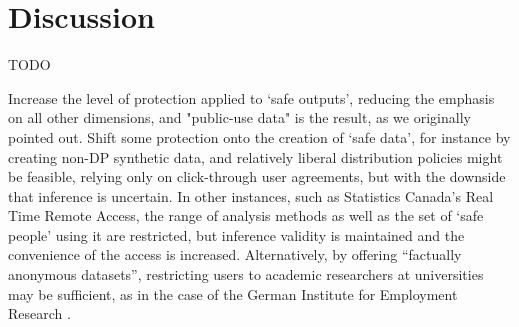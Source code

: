 



\section{Discussion}

TODO

Increase the level of protection applied to `safe outputs', reducing the emphasis on all other dimensions, and "public-use data" is the result, as we originally pointed out. Shift some protection onto the creation of  `safe data', for instance by creating non-DP synthetic data, and relatively liberal distribution policies might be feasible, relying only on click-through user agreements, but with the downside that inference is uncertain. In other instances, such as Statistics Canada's Real Time Remote Access, the range of analysis methods as well as the set of `safe people' using it are restricted,  but inference validity is maintained and the convenience of the access is increased. Alternatively, by offering ``factually anonymous datasets'', restricting users to academic researchers at universities may be sufficient, as in the case of the German Institute for Employment Research \cite{forschungsdatenzentrum_der_ba_im_iab_scientific_nodate}.

